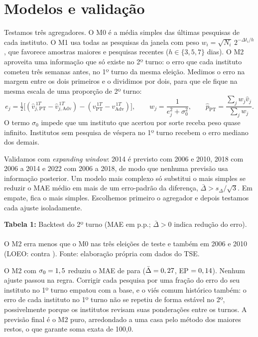 \documentclass[10pt,a4paper]{article}
\begin{document}
\section{Modelos e validação}
Testamos três agregadores. O M0 é a média simples das últimas pesquisas de cada instituto. O M1 usa todas as pesquisas da janela com peso $w_i=\sqrt{N_i}\,2^{-\Delta t_i/h}$, que favorece amostras maiores e pesquisas recentes ($h\in\{3,5,7\}$ dias). O M2 aproveita uma informação que só existe no 2º turno: o erro que cada instituto cometeu três semanas antes, no 1º turno da mesma eleição. Medimos o erro na margem entre os dois primeiros e o dividimos por dois, para que ele fique na mesma escala de uma proporção de 2º turno:
\begin{equation}
e_j=\tfrac12\big[(\hat v^{\,1T}_{j,\text{PT}}-\hat v^{\,1T}_{j,\text{Adv}})-(v^{\,1T}_{\text{PT}}-v^{\,1T}_{\text{Adv}})\big],\qquad
w_j=\frac{1}{e_j^2+\sigma_0^2},\qquad \hat p_{\text{PT}}=\frac{\sum_j w_j\hat v_j}{\sum_j w_j}.
\end{equation}
O termo $\sigma_0$ impede que um instituto que acertou por sorte receba peso quase infinito. Institutos sem pesquisa de véspera no 1º turno recebem o erro mediano dos demais.

Validamos com \emph{expanding window}: 2014 é previsto com 2006 e 2010, 2018 com 2006 a 2014 e 2022 com 2006 a 2018, de modo que nenhuma previsão usa informação posterior. Um modelo mais complexo só substitui o mais simples se reduzir o MAE médio em mais de um erro-padrão da diferença, $\bar\Delta>s_\Delta/\sqrt3$. Em empate, fica o mais simples. Escolhemos primeiro o agregador e depois testamos cada ajuste isoladamente.

\begin{center}\small
\textbf{Tabela 1:} Backtest do 2º turno (MAE em p.p.; $\bar\Delta>0$ indica redução do erro).\\[1pt]
\\[1pt]
{\footnotesize O M2 erra menos que o M0 nas três eleições de teste e também em 2006 e 2010 (LOEO: \loeoVenc{} contra \loeoMZero). Fonte: elaboração própria com dados do TSE.}
\end{center}

O M2 com $\sigma_0=1,5$ reduziu o MAE de \maeMZero{} para \maeVenc{} ($\bar\Delta=0,27$, EP $=0,14$). Nenhum ajuste passou na regra. Corrigir cada pesquisa por uma fração do erro do seu instituto no 1º turno empatou com a base, e o viés comum histórico também: o erro de cada instituto no 1º turno não se repetiu de forma estável no 2º, possivelmente porque os institutos revisam suas ponderações entre os turnos. A previsão final é o M2 puro, arredondado a uma casa pelo método dos maiores restos, o que garante soma exata de 100,0.
\end{document}
